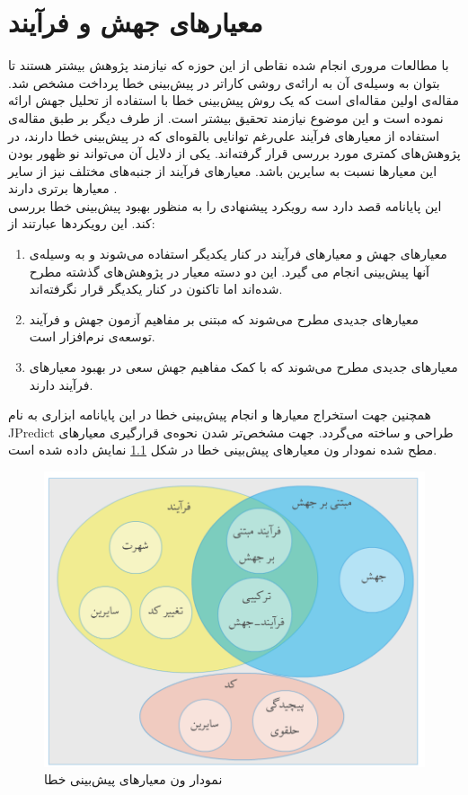 \chapter{معیارهای جهش و فرآیند}
 
\label{chap:method}
با  مطالعات مروری انجام شده نقاطی از این حوزه که نیازمند پژوهش بیشتر هستند تا بتوان به وسیله‌ی آن به ارائه‌ی روشی کاراتر در پیش‌بینی خطا پرداخت مشخص شد. مقاله‌ی \cite{bowes2016mutation} اولین مقاله‌ای است که  یک  روش پیش‌بینی خطا با استفاده از تحلیل جهش ارائه نموده  است و این موضوع نیازمند تحقیق بیشتر است. از طرف دیگر بر طبق مقاله‌ی \cite{radjenovic2013software} استفاده از معیارهای فرآیند علی‌رغم توانایی بالقوه‌ای که در پیش‌بینی خطا دارند، در پژوهش‌های کمتری مورد بررسی قرار گرفته‌اند. یکی از دلایل آن می‌تواند نو ظهور بودن این معیارها نسبت به سایرین باشد. معیارهای فرآیند از جنبه‌های مختلف نیز از سایر معیار‌ها برتری دارند \cite{rahman2013and}. \\
این پایانامه قصد دارد سه رویکرد  پیشنهادی را به منظور بهبود پیش‌بینی خطا بررسی کند.  این رویکردها عبارتند از:
\begin{enumerate}
\item
معیارهای جهش و معیارهای فرآیند در کنار یکدیگر استفاده می‌شوند و به وسیله‌ی آنها پیش‌بینی انجام می گیرد. این دو دسته معیار در پژوهش‌های گذشته مطرح شده‌اند اما تاکنون در کنار یکدیگر قرار نگرفته‌اند.
\item
معیارهای جدیدی مطرح می‌شوند که مبتنی بر مفاهیم آزمون جهش و فرآیند توسعه‌ی نرم‌افزار است.
\item
معیارهای جدیدی مطرح می‌شوند که با کمک مفاهیم جهش سعی در بهبود معیارهای فرآیند دارند.
\end{enumerate}

همچنین جهت استخراج معیارها و انجام پیش‌بینی خطا در این پایانامه ابزاری به نام JPredict طراحی و ساخته می‌گردد. جهت مشخص‌تر شدن نحوه‌ی قرارگیری معیارهای مطح شده نمودار ون معیارهای پیش‌بینی خطا در شکل \ref{fig:venn} نمایش داده شده است. 

\begin{figure}[H]
	\centering
	\includegraphics[width=.7\textwidth]{img/method/venn.png}
	\caption{نمودار ون معیارهای پیش‌بینی خطا }
	\label{fig:venn}
\end{figure}


